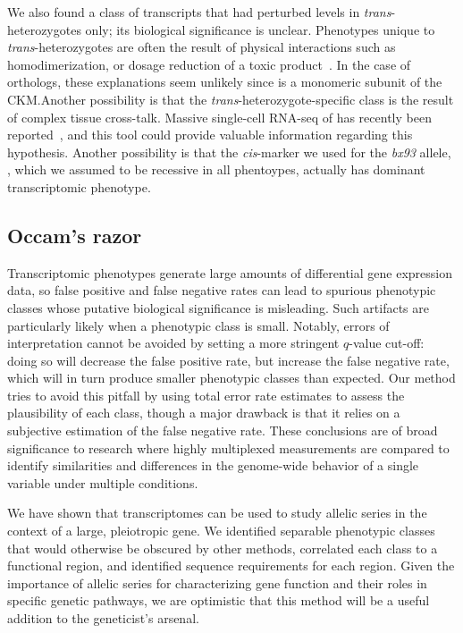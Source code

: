 We also found a class of transcripts that had perturbed levels in
\emph{trans}-heterozygotes only; its biological significance is unclear.
Phenotypes unique to \emph{trans}-heterozygotes are often the result of physical
interactions such as homodimerization, or dosage reduction of a toxic
product~\citep{Yook2005}. In the case of  orthologs, these
explanations seem unlikely since  is a monomeric subunit of the
CKM.\@ Another possibility is that the \emph{trans}-heterozygote-specific class
is the result of complex tissue cross-talk. Massive single-cell RNA-seq of
\cel{} has recently been reported~\citep{Cao2017}, and this tool could provide
valuable information regarding this hypothesis. Another possibility is that the
\emph{cis}-marker we used for the \emph{bx93} allele, , which
we assumed to be recessive in all phentoypes, actually has dominant
transcriptomic phenotype.

\subsection*{Occam's razor}
Transcriptomic phenotypes generate large amounts of differential gene expression
data, so false positive and false negative rates can lead to spurious phenotypic
classes whose putative biological significance is misleading. Such
artifacts are particularly likely when a phenotypic class is small. Notably,
errors of interpretation cannot be avoided by setting a more stringent $q$-value
cut-off: doing so will decrease the false positive rate, but increase the false
negative rate, which will in turn produce smaller phenotypic classes than
expected. Our method tries to avoid this pitfall by using total error rate
estimates to assess the plausibility of each class, though a major drawback is
that it relies on a subjective estimation of the false negative rate. These
conclusions are of broad significance to research where highly multiplexed
measurements are compared to identify similarities and differences in the
genome-wide behavior of a single variable under multiple conditions.

We have shown that transcriptomes can be used to study allelic series in the
context of a large, pleiotropic gene. We identified separable phenotypic classes
that would otherwise be obscured by other methods, correlated each class to a
functional region, and identified sequence requirements for each region. Given
the importance of allelic series for characterizing gene function and their
roles in specific genetic pathways, we are optimistic that this method will be a
useful addition to the geneticist's arsenal.

